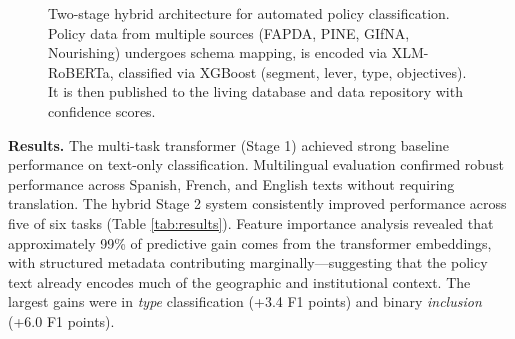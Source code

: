 \documentclass[a4paper,12pt]{article}
\begin{document}
\begin{figure}[htbp]
{
}
\caption{Two-stage hybrid architecture for automated policy classification. Policy data from multiple sources (FAPDA, PINE, GIfNA, Nourishing) undergoes schema mapping, is encoded via XLM-RoBERTa, classified via XGBoost (segment, lever, type, objectives). It is then published to the living database and data repository with confidence scores.}
\label{fig:architecture}
\end{figure}

\noindent\textbf{Results.} The multi-task transformer (Stage 1) achieved strong baseline performance on text-only classification. Multilingual evaluation confirmed robust performance across Spanish, French, and English texts without requiring translation. The hybrid Stage 2 system consistently improved performance across five of six tasks (Table \ref{tab:results}). Feature importance analysis revealed that approximately 99\% of predictive gain comes from the transformer embeddings, with structured metadata contributing marginally---suggesting that the policy text already encodes much of the geographic and institutional context. The largest gains were in \textit{type} classification (+3.4 F1 points) and binary \textit{inclusion} (+6.0 F1 points).
\end{document}
